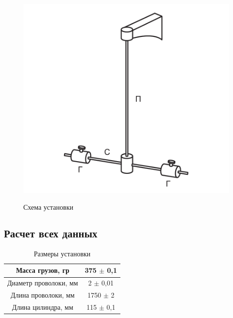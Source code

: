 \documentclass[a4paper]{article}
\begin{document}
\begin{figure}[!h]
    \begin{center}
        \includegraphics[scale=0.7]{ystanovka2.png}
        \begin{center}
        \caption{Схема установки}
        \end{center}
        \label{graphic1b}
    \end{center}
\end{figure}

\newpage
\subsection{Расчет всех данных}

\begin{table}[h!]
\begin{center}
\begin{tabular}{|c|c|}
\hline
Масса грузов, гр     & 375 $\pm$ 0,1 \\ \hline
Диаметр проволоки, мм & 2 $\pm$ 0,01 \\ \hline
Длина проволоки, мм   & 1750 $\pm$ 2    \\ \hline
Длина цилиндра, мм    & 115 $\pm$ 0,1    \\ \hline
\end{tabular}
\caption{Размеры установки}
\end{center}
\end{table}
\end{document}

